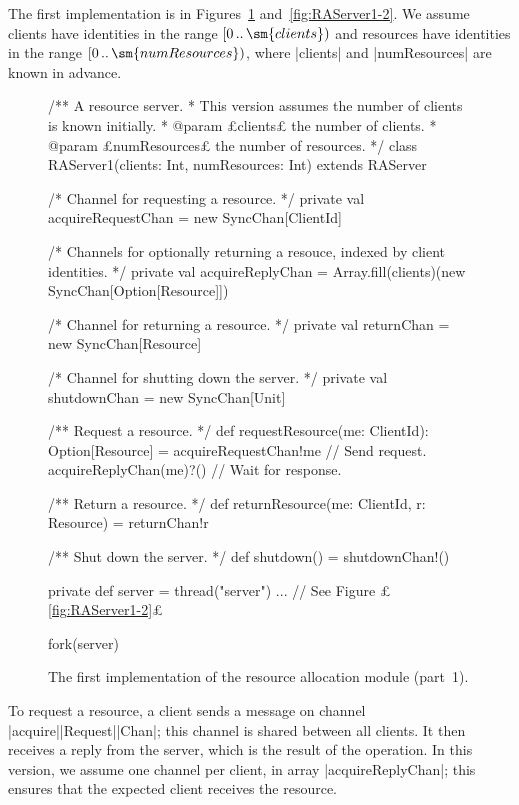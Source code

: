 
The first implementation is in Figures~\ref{fig:RAServer1-1}
and~\ref{fig:RAServer1-2}.  We assume clients have identities in the range
$\interval0{\sm{clients}}$ and resources have identities in the range
$\interval0{\sm{numResources}}$, where |clients| and |numResources| are known
in advance.


\begin{figure}
\begin{scala}
/** A resource server. 
  * This version assumes the number of clients is known initially. 
  * @param £clients£ the number of clients.
  * @param £numResources£ the number of resources.  */
class RAServer1(clients: Int, numResources: Int) extends RAServer{

  /* Channel for requesting a resource. */
  private val acquireRequestChan = new SyncChan[ClientId]

  /* Channels for optionally returning a resouce, indexed by client identities. */
  private val acquireReplyChan = 
    Array.fill(clients)(new SyncChan[Option[Resource]])

  /* Channel for returning a resource. */
  private val returnChan = new SyncChan[Resource]

  /* Channel for shutting down the server. */
  private val shutdownChan = new SyncChan[Unit]

  /** Request a resource. */
  def requestResource(me: ClientId): Option[Resource] = {
    acquireRequestChan!me  // Send request.
    acquireReplyChan(me)?() // Wait for response.
  }

  /** Return a resource. */
  def returnResource(me: ClientId, r: Resource) = returnChan!r

  /** Shut down the server. */
  def shutdown() = shutdownChan!()

  private def server = thread("server"){ ...  } // See Figure £\ref{fig:RAServer1-2}£

  fork(server)
}
\end{scala}
\caption{The first implementation of the resource allocation module (part~1).}
\label{fig:RAServer1-1} 
\end{figure}


To request a resource, a client sends a message on channel
|acquire|\-|Request|\-|Chan|; this channel is shared between all clients.  It
then receives a reply from the server, which is the result of the operation.
In this version, we assume one channel per client, in array
|acquireReplyChan|; this ensures that the expected client receives the
resource.

